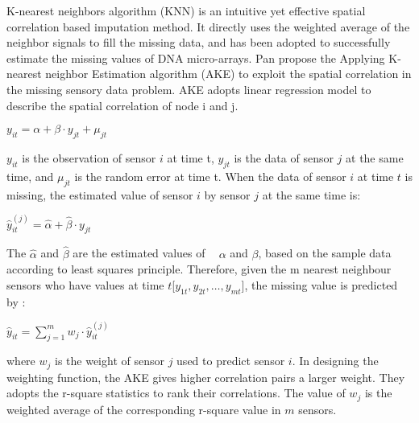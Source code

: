 K-nearest neighbors algorithm (KNN) is an intuitive yet effective spatial correlation based imputation method. It directly uses the weighted average of the neighbor signals to fill the missing data, and has been adopted to successfully estimate the missing values of DNA micro-arrays\cite{Troyanskaya:DNAKNN}.  
Pan\cite{pan2010k} propose the Applying K-nearest neighbor Estimation algorithm (AKE) to exploit the spatial correlation in the missing sensory data problem. 
AKE adopts linear regression model to describe the spatial correlation of node i and j. 
\begin{center}
$y_{it} = \alpha + \beta\cdot y_{jt} + \mu_{jt} $
\end{center}
$y_{it}$ is the observation of sensor $i$ at time t, $y_{jt}$ is the data of sensor $j$ at the same time, and $\mu_{jt}$ is the random error at time t.   
When the data of sensor $i$ at time $t$ is missing, the estimated value of sensor $i$ by sensor $j$ at the same time is:
\begin{center}
$\hat{y}_{it}^{(j)} =\hat{\alpha} +\hat{\beta}\cdot y_{jt}$
\end{center}
The $\hat{\alpha}$ and $\hat{\beta}$ are the estimated values of  $\alpha$ and $\beta$, based on the sample data according to least squares principle.
Therefore, given the m nearest neighbour sensors who have values at time $t$[$y_{1t}, y_{2t},\dots, y_{mt}$], the missing value is predicted by :   
 \begin{center}
$ \hat{y}_{it} =\sum_{j=1}^m w_j \cdot \hat{y}_{it}^{(j)}$
 \end{center}
%
where $w_j$ is the weight of sensor $j$ used to predict sensor $i$. In designing the weighting function, the AKE gives higher correlation pairs a larger weight. They adopts the r-square statistics to rank their correlations. The value of $w_j$ is the weighted average of the corresponding r-square value in $m$ sensors. 

